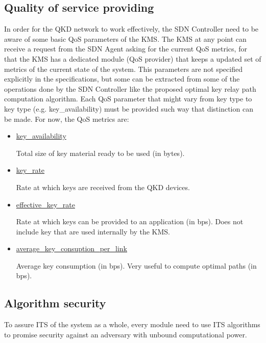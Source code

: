 \begin{refsection}
\subsection{Quality of service providing}
In order for the QKD network to work effectively, the SDN Controller need to be aware of some basic QoS parameters of the \ac{KMS}. The \ac{KMS} at any point can receive a request from the SDN Agent asking for the current QoS metrics, for that the \ac{KMS} has a dedicated module (QoS provider) that keeps a updated set of metrics of the current state of the system. This parameters are not specified explicitly in the specifications, but some can be extracted from some of the operations done by the SDN Controller like the proposed optimal key relay path computation algorithm. Each QoS parameter that might vary from key type to key type (e.g. key\_availability) must be provided such way that distinction can be made. For now, the QoS metrics are:

\begin{itemize}
	\item \underline{key\_availability}
	
	Total size of key material ready to be used (in bytes).
	
	\item \underline{key\_rate}	
	
	Rate at which keys are received from the QKD devices. 
	
	\item \underline{effective\_key\_rate}	
	
	Rate at which keys can be provided to an application (in bps). Does not include key that are used internally by the KMS.
	
	\item \underline{average\_key\_consuption\_per\_link}	
	
	Average key consumption (in bps). Very useful to compute optimal paths (in bps).
	
\end{itemize}

\subsection{Algorithm security}
To assure \ac{ITS} of the system as a whole, every module need to use \ac{ITS} algorithms to promise security against an adversary with unbound computational power. 


\end{refsection}
